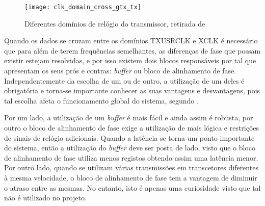 \begin{figure}[h!]
	\begin{center}
		\leavevmode
		\texttt{[image: clk\_domain\_cross\_gtx\_tx]}
		\caption{Diferentes domínios de relógio do transmissor, retirada de \cite{R011}}
		\label{fig:clk_domains_tx}
	\end{center}
\end{figure}

Quando os dados se cruzam entre os domínios TXUSRCLK e XCLK é necessário que para além de terem frequências semelhantes, as diferenças de fase que possam existir estejam resolvidas, e por isso existem dois blocos responsáveis por tal que apresentam os seus prós e contras: \textit{buffer} ou bloco de alinhamento de fase. Independentemente da escolha de um ou de outro, a utilização de um deles é obrigatória e torna-se importante conhecer as suas vantagens e desvantagens, pois tal escolha afeta o funcionamento global do sistema, segundo \cite{R011}.

Por um lado, a utilização de um \textit{buffer} é mais fácil e ainda assim é robusta, por outro o bloco de alinhamento de fase exige a utilização de mais lógica e restrições de sinais de relógio adicionais. Quando a latência se torna um ponto importante do sistema, então a utilização do \textit{buffer} deve ser posta de lado, visto que o bloco de alinhamento de fase utiliza menos registos obtendo assim uma latência menor. Por outro lado, quando se utilizam várias transmissões em transcetores diferentes à mesma velocidade, o bloco de alinhamento de fase tem a vantagem de diminuir o atraso entre as mesmas. No entanto, isto é apenas uma curiosidade visto que tal não é utilizado no projeto.

